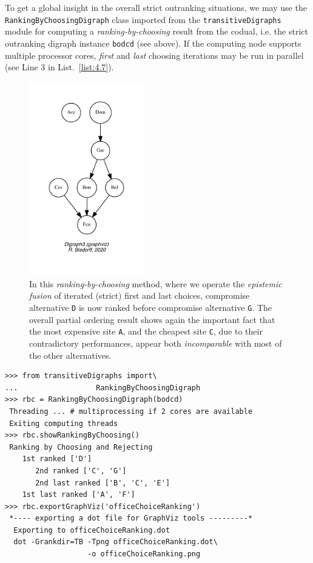 To get a global insight in the overall strict outranking situations, we may use the \texttt{RankingByChoosingDigraph} class imported from the \texttt{transitive\-Digraphs} module for computing a \emph{ranking-by-choosing} result from the codual, i.e. the strict outranking digraph instance \texttt{bodcd} (see above). If the computing node supports multiple processor cores, \emph{first} and \emph{last} choosing iterations may be run in parallel (see Line 3 in List.~\vref{list:4.7}).
\begin{figure}[ht]
\sidecaption[t]
\includegraphics[width=5cm]{Figures/4-4-officeChoiceRanking.pdf}
\caption{In this \emph{ranking-by-choosing} method, where we operate the \emph{epistemic fusion} of iterated (strict) first and last choices, compromise alternative \texttt{D} is now ranked before compromise alternative \texttt{G}. The overall partial ordering result shows again the important fact that the most expensive site \texttt{A}, and the cheapest site \texttt{C}, due to their contradictory performances, appear both \emph{incomparable} with most of the other alternatives.} 
\label{fig:4.4}       %
\end{figure}
\begin{lstlisting}[caption={Ranking-by-choosing the outranking digraph},label=list:4.7]
>>> from transitiveDigraphs import\
...                  RankingByChoosingDigraph
>>> rbc = RankingByChoosingDigraph(bodcd)
 Threading ... # multiprocessing if 2 cores are available
 Exiting computing threads
>>> rbc.showRankingByChoosing()
 Ranking by Choosing and Rejecting
    1st ranked ['D']
       2nd ranked ['C', 'G']
       2nd last ranked ['B', 'C', 'E']
    1st last ranked ['A', 'F']
>>> rbc.exportGraphViz('officeChoiceRanking')
 *---- exporting a dot file for GraphViz tools ---------*
  Exporting to officeChoiceRanking.dot
  dot -Grankdir=TB -Tpng officeChoiceRanking.dot\
                   -o officeChoiceRanking.png
\end{lstlisting}

